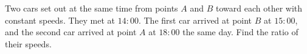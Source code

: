 Two cars set out at the same time from points $A$ and $B$ toward each other with constant speeds. They met at $14{:}00$. The first car arrived at point $B$ at $15{:}00$, and the second car arrived at point $A$ at $18{:}00$ the same day. Find the ratio of their speeds.
